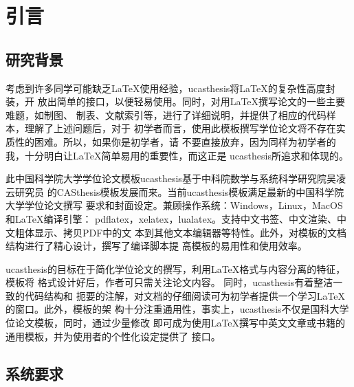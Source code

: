 \chapter{引言}\label{chap:introduction}

\section{研究背景}

考虑到许多同学可能缺乏\LaTeX{}使用经验，ucasthesis将\LaTeX{}的复杂性高度封装，开
放出简单的接口，以便轻易使用。同时，对用\LaTeX{}撰写论文的一些主要难题，如制图、
制表、文献索引等，进行了详细说明，并提供了相应的代码样本，理解了上述问题后，对于
初学者而言，使用此模板撰写学位论文将不存在实质性的困难。所以，如果你是初学者，请
不要直接放弃，因为同样为初学者的我，十分明白让\LaTeX{}简单易用的重要性，而这正是
ucasthesis所追求和体现的。

此中国科学院大学学位论文模板ucasthesis基于中科院数学与系统科学研究院吴凌云研究员
的CASthesis模板发展而来。当前ucasthesis模板满足最新的中国科学院大学学位论文撰写
要求和封面设定。兼顾操作系统：Windows，Linux，MacOS 和\LaTeX{}编译引擎：
pdflatex，xelatex，lualatex。支持中文书签、中文渲染、中文粗体显示、拷贝PDF中的文
本到其他文本编辑器等特性。此外，对模板的文档结构进行了精心设计，撰写了编译脚本提
高模板的易用性和使用效率。

ucasthesis的目标在于简化学位论文的撰写，利用\LaTeX{}格式与内容分离的特征，模板将
格式设计好后，作者可只需关注论文内容。 同时，ucasthesis有着整洁一致的代码结构和
扼要的注解，对文档的仔细阅读可为初学者提供一个学习\LaTeX{}的窗口。此外，模板的架
构十分注重通用性，事实上，ucasthesis不仅是国科大学位论文模板，同时，通过少量修改
即可成为使用\LaTeX{}撰写中英文文章或书籍的通用模板，并为使用者的个性化设定提供了
接口。

\section{系统要求}\label{sec:system}

